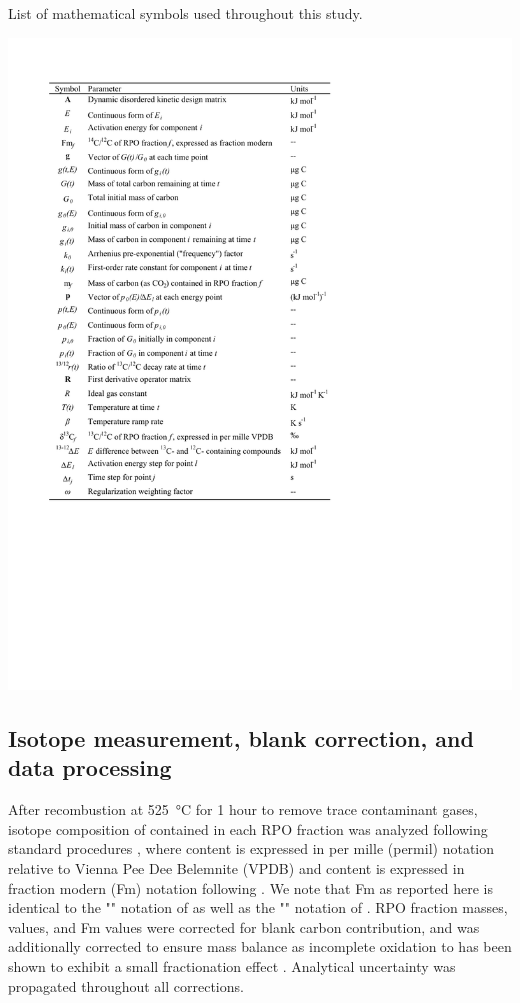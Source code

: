 \begin{table}[p]
	\caption[List of mathematical symbols used throughout this study]{List of mathematical symbols used throughout this study.}
	\centering
		\includegraphics{Thesis_Tables/Ch3Tab1}
	\label{Ch3Tab:1} 
\end{table}

\subsection{Isotope measurement, blank correction, and data processing}

After recombustion at \SI{525}{\celsius} for 1 hour to remove trace contaminant gases, isotope composition of  contained in each RPO fraction was analyzed following standard procedures \citep{McNichol:1994ty,Pearson:1998vy}, where  content is expressed in  per mille (\si{permil}) notation relative to Vienna Pee Dee Belemnite (VPDB) and  content is expressed in fraction modern (Fm) notation following \citet{Stuiver:1977uh}. We note that Fm as reported here is identical to the "" notation of \citet{Mook:1999vf} as well as the "" notation of \citet{Reimer:2004th}. RPO fraction masses,  values, and Fm values were corrected for blank carbon contribution, and  was additionally corrected to ensure  mass balance as incomplete oxidation to  has been shown to exhibit a small fractionation effect \citep{Hemingway:2016rc}. Analytical uncertainty was propagated throughout all corrections.

